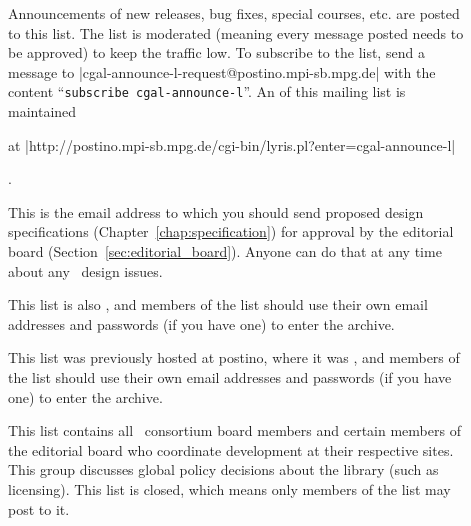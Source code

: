 \begin{description}
\item[] 
     Announcements of new releases, bug fixes, special courses, etc. are posted
     to this list.  The list is moderated (meaning every message posted needs
     to be approved) to keep the traffic low.
     To subscribe to the list, send a message to
     {\nonlinkedpath|cgal-announce-l-request@postino.mpi-sb.mpg.de|}
     with the content ``\texttt{subscribe cgal-announce-l}''.
     An  
     of this mailing list is maintained%
     \begin{ccTexOnly}
     at \nonlinkedpath|http://postino.mpi-sb.mpg.de/cgi-bin/lyris.pl?enter=cgal-announce-l|
     \end{ccTexOnly}.

\item[] 
     This is the email address to which you should
     send proposed design specifications (Chapter~\ref{chap:specification})
     for approval by the editorial 
     board (Section~\ref{sec:editorial_board}). Anyone can do that 
     at any time about any \cgal\ design issues. 

     This list is also
     , and members of the list should use their own
     email addresses and passwords (if you have one) to enter the archive.

     This list was previously hosted at postino, where it was
     , and members of the list should use their own
     email addresses and passwords (if you have one) to enter the archive.

\item[] 
     This list contains all \galia\ consortium board members and certain 
     members of the editorial board who coordinate development at their 
     respective sites.
     This group discusses global policy decisions about the library (such
     as licensing).  This list is closed, which means only members of the list 
     may post to it.


\end{description}
